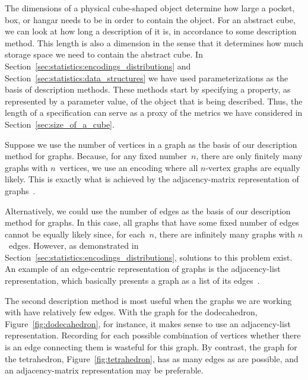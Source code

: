 The dimensions of a physical cube-shaped object determine how large a pocket, box, or hangar needs to be in order to contain the object.
For an abstract cube, we can look at how long a description of it is, in accordance to some description method.
This length is also a dimension in the sense that it determines how much storage space we need to contain the abstract cube.
In Section~\ref{sec:statistics:encodings_distributions} and Section~\ref{sec:statistics:data_structures} we have used parameterizations as the basis of description methods.
These methods start by specifying a property, as represented by a parameter value, of the object that is being described.
Thus, the length of a specification can serve as a proxy of the metrics we have considered in Section~\ref{sec:size_of_a_cube}.
\begin{example}
  Suppose we use the number of vertices in a graph as the basis of our description method for graphs.
  Because, for any fixed number~$n$, there are only finitely many graphs with $n$~vertices, we use an encoding where all $n$-vertex graphs are equally likely.
  This is exactly what is achieved by the adjacency-matrix representation of graphs~\parencite{cormen2009introduction}.

  Alternatively, we could use the number of edges as the basis of our description method for graphs.
  In this case, all graphs that have some fixed number of edges cannot be equally likely since, for each~$n$, there are infinitely many graphs with $n$~edges.
  However, as demonstrated in Section~\ref{sec:statistics:encodings_distributions}, solutions to this problem exist.
  An example of an edge-centric representation of graphs is the adjacency-list representation, which basically presents a graph as a list of its edges~\parencite{cormen2009introduction}.

  The second description method is most useful when the graphs we are working with have relatively few edges.
  With the graph for the dodecahedron, Figure~\ref{fig:dodecahedron}, for instance, it makes sense to use an adjacency-list representation.
  Recording for each possible combination of vertices whether there is an edge connecting them is wasteful for this graph.
  By contrast, the graph for the tetrahedron, Figure~\ref{fig:tetrahedron}, has as many edges as are possible, and an adjacency-matrix representation may be preferable.
\end{example}

